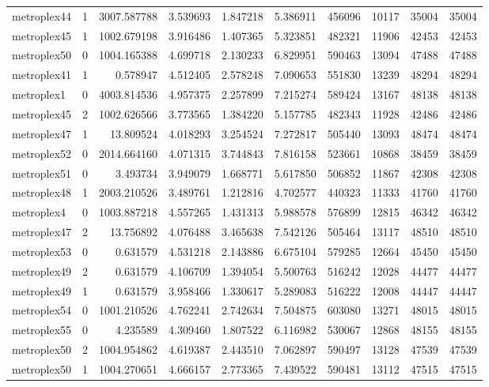 \documentclass[../../../thesis.tex]{subfiles}
\begin{document}
\begin{longtable}{|l|r|r|r|r|r|r|r|r|r|}
metroplex44 & 1 & 3007.587788 & 3.539693 & 1.847218 & 5.386911 & 456096 & 10117 & 35004 & 35004 \\
metroplex45 & 1 & 1002.679198 & 3.916486 & 1.407365 & 5.323851 & 482321 & 11906 & 42453 & 42453 \\
metroplex50 & 0 & 1004.165388 & 4.699718 & 2.130233 & 6.829951 & 590463 & 13094 & 47488 & 47488 \\
metroplex41 & 1 & 0.578947 & 4.512405 & 2.578248 & 7.090653 & 551830 & 13239 & 48294 & 48294 \\
metroplex1 & 0 & 4003.814536 & 4.957375 & 2.257899 & 7.215274 & 589424 & 13167 & 48138 & 48138 \\
metroplex45 & 2 & 1002.626566 & 3.773565 & 1.384220 & 5.157785 & 482343 & 11928 & 42486 & 42486 \\
metroplex47 & 1 & 13.809524 & 4.018293 & 3.254524 & 7.272817 & 505440 & 13093 & 48474 & 48474 \\
metroplex52 & 0 & 2014.664160 & 4.071315 & 3.744843 & 7.816158 & 523661 & 10868 & 38459 & 38459 \\
metroplex51 & 0 & 3.493734 & 3.949079 & 1.668771 & 5.617850 & 506852 & 11867 & 42308 & 42308 \\
metroplex48 & 1 & 2003.210526 & 3.489761 & 1.212816 & 4.702577 & 440323 & 11333 & 41760 & 41760 \\
metroplex4 & 0 & 1003.887218 & 4.557265 & 1.431313 & 5.988578 & 576899 & 12815 & 46342 & 46342 \\
metroplex47 & 2 & 13.756892 & 4.076488 & 3.465638 & 7.542126 & 505464 & 13117 & 48510 & 48510 \\
metroplex53 & 0 & 0.631579 & 4.531218 & 2.143886 & 6.675104 & 579285 & 12664 & 45450 & 45450 \\
metroplex49 & 2 & 0.631579 & 4.106709 & 1.394054 & 5.500763 & 516242 & 12028 & 44477 & 44477 \\
metroplex49 & 1 & 0.631579 & 3.958466 & 1.330617 & 5.289083 & 516222 & 12008 & 44447 & 44447 \\
metroplex54 & 0 & 1001.210526 & 4.762241 & 2.742634 & 7.504875 & 603080 & 13271 & 48015 & 48015 \\
metroplex55 & 0 & 4.235589 & 4.309460 & 1.807522 & 6.116982 & 530067 & 12868 & 48155 & 48155 \\
metroplex50 & 2 & 1004.954862 & 4.619387 & 2.443510 & 7.062897 & 590497 & 13128 & 47539 & 47539 \\
metroplex50 & 1 & 1004.270651 & 4.666157 & 2.773365 & 7.439522 & 590481 & 13112 & 47515 & 47515 \\

\end{longtable}
\end{document}
